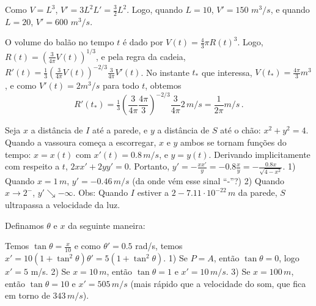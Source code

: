 \begin{Solution}{6.37}
Como $V=L^3$, $V'=3L^2L'=\frac32 L^2$.
Logo, quando $L=10$, $V'=150$ $m^3/s$, e quando
$L=20$, $V'=600$ $m^3/s$.
\end{Solution}
\begin{Solution}{6.38}
O volume do balão no tempo $t$ é dado por $V(t)=\tfrac43 \pi R(t)^3$.
Logo, $R(t)=(\frac{3}{4\pi}V(t))^{1/3}$, e pela regra da cadeia,
$R'(t)=\tfrac13(\frac{3}{4\pi}V(t))^{-2/3}\frac{3}{4\pi}V'(t)$.
No instante $t_*$ que interessa, $V(t_*)=\frac{4\pi}{3}m^3$, e como
$V'(t)=2m^3/s$ para todo $t$, obtemos
$$
R'(t_*)=\tfrac13(\frac{3}{4\pi}\frac{4\pi}{3})^{-2/3}\frac{3}{4\pi}2\,m/s=\frac{
1}{2\pi}m/s\,.
$$
\end{Solution}
\begin{Solution}{6.39}
Seja $x$ a distância de $I$ até a parede, e $y$ a distância de $S$ até o chão:
$x^2+y^2=4$. Quando a vassoura começa a escorregar, $x$ e $y$ ambos se
tornam funções do tempo: $x=x(t)$ com $x'(t)=0.8\,m/s$, e $y=y(t)$. Derivando
implicitamente com respeito a $t$,
$2xx'+2yy'=0$. Portanto,
$y'=-\frac{xx'}{y}=-0.8\frac{x}{y}=-\frac{0.8x}{\sqrt{4-x^2}}$.
1) Quando $x=1\,m$, $y'=-0.46\,m/s$ (da onde vém esse sinal ``-''?)
2) Quando $x\to 2^-$, $y'\searrow -\infty$.
Obs: Quando $I$ estiver a $2-7.11\cdot 10^{-22}\,m$ da parede,
$S$ ultrapassa a velocidade da luz.
\end{Solution}
\begin{Solution}{6.40}
Definamos $\theta$ e $x$ da seguinte maneira:
\begin{center}
\begin{bmlimage}\end{bmlimage}
\end{center}
Temos $\tan \theta=\frac{x}{10}$ e como $\theta'=0.5$ rad/s, temos
$x'=10(1+\tan^2\theta)\theta'=5(1+\tan^2\theta)$.
1) Se $P=A$, então $\tan \theta=0$, logo $x'=5$ m/s. 2) Se $x=10\,m$, então
$\tan \theta=1$ e $x'=10\,m/s$.
3) Se  $x=100\,m$, então $\tan \theta=10$ e $x'=505\,m/s$ (mais rápido que a
velocidade do som, que fica em torno de $343\, m/s$).
\end{Solution}
